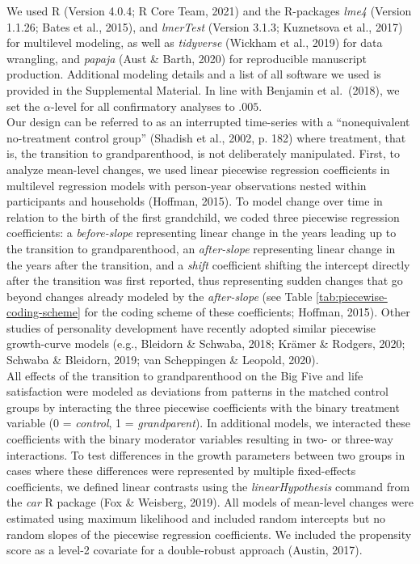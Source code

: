 \documentclass[
  english,
  man, noextraspace]{apa7}
\begin{document}
We used R (Version 4.0.4; R Core Team, 2021) and the R-packages \emph{lme4} (Version 1.1.26; Bates et al., 2015), and \emph{lmerTest} (Version 3.1.3; Kuznetsova et al., 2017) for multilevel modeling, as well as \emph{tidyverse} (Wickham et al., 2019) for data wrangling, and \emph{papaja} (Aust \& Barth, 2020) for reproducible manuscript production. Additional modeling details and a list of all software we used is provided in the Supplemental Material. In line with Benjamin et al.~(2018), we set the \(\alpha\)-level for all confirmatory analyses to \(.005\).\\
Our design can be referred to as an interrupted time-series with a \enquote{nonequivalent no-treatment control group} (Shadish et al., 2002, p. 182) where treatment, that is, the transition to grandparenthood, is not deliberately manipulated. First, to analyze mean-level changes, we used linear piecewise regression coefficients in multilevel regression models with person-year observations nested within participants and households (Hoffman, 2015). To model change over time in relation to the birth of the first grandchild, we coded three piecewise regression coefficients: a \emph{before-slope} representing linear change in the years leading up to the transition to grandparenthood, an \emph{after-slope} representing linear change in the years after the transition, and a \emph{shift} coefficient shifting the intercept directly after the transition was first reported, thus representing sudden changes that go beyond changes already modeled by the \emph{after-slope} (see Table \ref{tab:piecewise-coding-scheme} for the coding scheme of these coefficients; Hoffman, 2015). Other studies of personality development have recently adopted similar piecewise growth-curve models (e.g., Bleidorn \& Schwaba, 2018; Krämer \& Rodgers, 2020; Schwaba \& Bleidorn, 2019; van Scheppingen \& Leopold, 2020).\\
All effects of the transition to grandparenthood on the Big Five and life satisfaction were modeled as deviations from patterns in the matched control groups by interacting the three piecewise coefficients with the binary treatment variable (0 = \emph{control}, 1 = \emph{grandparent}). In additional models, we interacted these coefficients with the binary moderator variables resulting in two- or three-way interactions. To test differences in the growth parameters between two groups in cases where these differences were represented by multiple fixed-effects coefficients, we defined linear contrasts using the \emph{linearHypothesis} command from the \emph{car} R package (Fox \& Weisberg, 2019). All models of mean-level changes were estimated using maximum likelihood and included random intercepts but no random slopes of the piecewise regression coefficients. We included the propensity score as a level-2 covariate for a double-robust approach (Austin, 2017).\\
\end{document}
